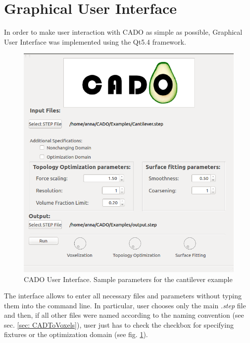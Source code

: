 \section{Graphical User Interface}
\label{sec:gui}
In order to make user interaction with CADO as simple as possible, Graphical User Interface was implemented using the Qt5.4 \cite{Qt} framework. 
\begin{figure}
\centering
\includegraphics[scale=0.4]{Pictures/CADO_mainWindowParameters.png}
\caption{CADO User Interface. Sample parameters for the cantilever example}
\label{fig:mainWindowParameters}
\end{figure}
The interface allows to enter all necessary files and parameters without typing them into the command line. In particular, user chooses only the main \textit{.step} file and then, if all other files were named according to the naming convention (see sec. \ref{sec: CADToVoxels}), user just has to check the checkbox for specifying fixtures or the optimization domain (see fig. \ref{fig:mainWindowParameters}).

